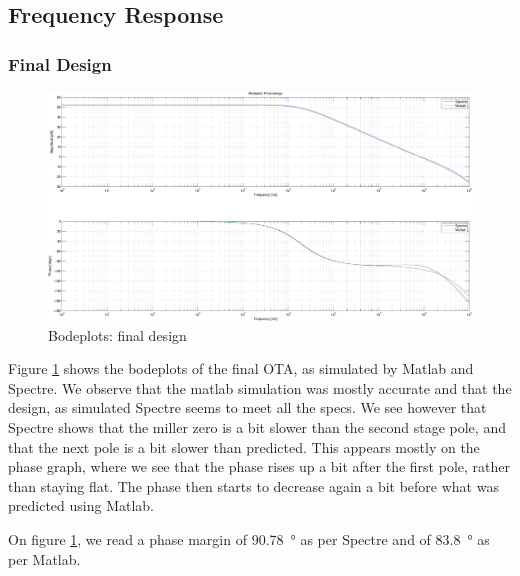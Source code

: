 \documentclass[english,10pt]{article}
\begin{document}
\subsection{Frequency Response}
\subsubsection{Final Design}\label{sec:final}
\begin{figure}[htbp]
  \centering
  \includegraphics[width = \textwidth]{6_1.pdf}
  \caption{Bodeplots: final design\label{fig:final}}
\end{figure}
Figure \ref{fig:final} shows the bodeplots of the final OTA, as simulated by Matlab and Spectre. We observe that the matlab simulation was mostly accurate and that the design, as simulated Spectre seems to meet all the specs. We see however that Spectre shows that the miller zero is a bit slower than the second stage pole, and that the next pole is a bit slower than predicted. This appears mostly on the phase graph, where we see that the phase rises up a bit after the first pole, rather than staying flat. The phase then starts to decrease again a bit before what was predicted using Matlab.

On figure \ref{fig:final}, we read a phase margin of \SI{90.78}{\degree} as per Spectre and of \SI{83.8}{\degree} as per Matlab.
\end{document}
